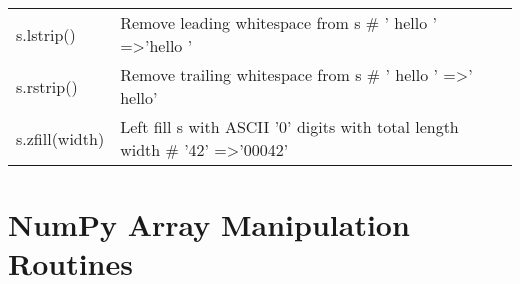 \documentclass[a4paper,11pt]{book}
\numberwithin{figure}{chapter}
\numberwithin{table}{chapter}
\begin{document}
\begin{appendices}
\begin{table}[!htbp]
\begin{tabular}{lp{12cm}}
s.lstrip()               & Remove leading whitespace from s \# ' hello ' =\textgreater 'hello '                                                                            \\
s.rstrip()               & Remove trailing whitespace from s \# ' hello ' =\textgreater ' hello'                                                                           \\
s.zfill(width)           & Left fill s with ASCII '0' digits with total length width \# '42' =\textgreater '00042'  
   \\                                                      
\bottomrule
\end{tabular}
\end{table}
\clearpage

\section{NumPy Array Manipulation Routines}


\end{appendices}
\end{document}
